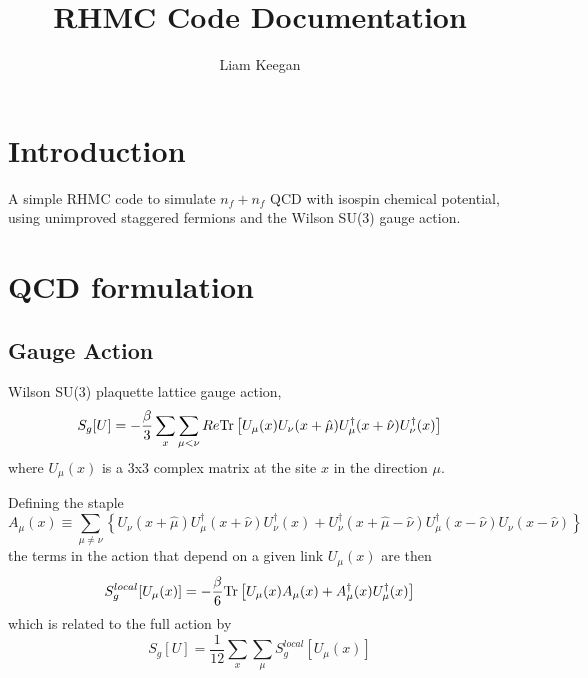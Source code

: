 \documentclass[a4paper,12pt]{article}
\newcommand{\Tr}{{\rm Tr}}
\begin{document}
\author{Liam Keegan}
\title{RHMC Code Documentation}

\maketitle

\section{Introduction}
A simple RHMC code to simulate $n_f+n_f$ QCD with isospin chemical potential, using unimproved staggered fermions and the Wilson SU(3) gauge action.

\section{QCD formulation}
\subsection{Gauge Action}
Wilson SU(3) plaquette lattice gauge action,
\begin{equation}
 S_g[U] = -\frac{\beta}{3} \sum_x \sum_{\mu<\nu} Re \Tr \left[ U_{\mu}(x)  U_{\nu}(x+\hat\mu)  U_{\mu}^{\dagger}(x+\hat\nu)  U_{\nu}^{\dagger}(x)\right]
\end{equation}
where $U_\mu(x)$ is a 3x3 complex matrix at the site $x$ in the direction $\mu$.

Defining the staple
\begin{equation}
 A_\mu(x) \equiv \sum_{\mu\neq\nu} \left\{
 U_{\nu}(x+\hat\mu) U_{\mu}^{\dagger}(x+\hat\nu)  U_{\nu}^{\dagger}(x) +
 U_{\nu}^{\dagger}(x+\hat\mu-\hat\nu) U_{\mu}^{\dagger}(x-\hat\nu)  U_{\nu}(x-\hat\nu) \right\}
\end{equation}
the terms in the action that depend on a given link $U_{\mu}(x)$ are then
\begin{equation}
 S_g^{local}[U_{\mu}(x)] = -\frac{\beta}{6} \Tr \left[ U_{\mu}(x) A_{\mu}(x) + A_{\mu}^{\dagger}(x)U_{\mu}^{\dagger}(x)  \right]
\end{equation}
which is related to the full action by
\begin{equation}
 S_g[U] = \frac{1}{12} \sum_{x} \sum_{\mu} S_g^{local}[U_{\mu}(x)]
\end{equation}
\end{document}
